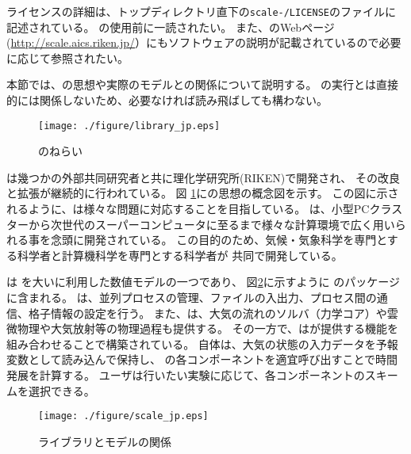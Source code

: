 ライセンスの詳細は、トップディレクトリ直下の\texttt{scale-\version/LICENSE}のファイルに記述されている。
\scalelib の使用前に一読されたい。
また、\scalelib のWebページ(\url{http://scale.aics.riken.jp/}）にもソフトウェアの説明が記載されているので必要に応じて参照されたい。

本節では、\scalelib の思想や実際のモデルとの関係について説明する。
\scalerm の実行とは直接的には関係しないため、必要なければ読み飛ばしても構わない。


\begin{figure}[htb]
\begin{center}
  \texttt{[image: ./figure/library\_jp.eps]}\\
  \caption{\scalelib のねらい}
  \label{fig:scale}
\end{center}
\end{figure}

\scalelib は幾つかの外部共同研究者と共に理化学研究所(RIKEN)で開発され、
その改良と拡張が継続的に行われている。
図 \ref{fig:scale}に\scalelib の思想の概念図を示す。
この図に示されるように、\scalelib は様々な問題に対応することを目指している。
\scalelib は、小型PCクラスターから次世代のスーパーコンピュータに至るまで様々な計算環境で広く用いられる事を念頭に開発されている。
この目的のため、気候・気象科学を専門とする科学者と計算機科学を専門とする科学者が
共同で開発している。

\scalerm は \scalelib を大いに利用した数値モデルの一つであり、
図\ref{fig:scale-rm}に示すように \scalelib のパッケージに含まれる。
\scalelib は、並列プロセスの管理、ファイルの入出力、プロセス間の通信、格子情報の設定を行う。
また、\scalelib は、大気の流れのソルバ（力学コア）や雲微物理や大気放射等の物理過程も提供する。
その一方で、\scalerm は\scalelib が提供する機能を組み合わせることで構築されている。
\scalerm 自体は、大気の状態の入力データを予報変数として読み込んで保持し、
\scalelib の各コンポーネントを適宜呼び出すことで時間発展を計算する。
ユーザは行いたい実験に応じて、各コンポーネントのスキームを選択できる。

\begin{figure}[hbt]
\begin{center}
  \texttt{[image: ./figure/scale\_jp.eps]}\\
  \caption{ライブラリ{\scalelib}とモデル{\scalerm}の関係}
  \label{fig:scale-rm}
\end{center}
\end{figure}



